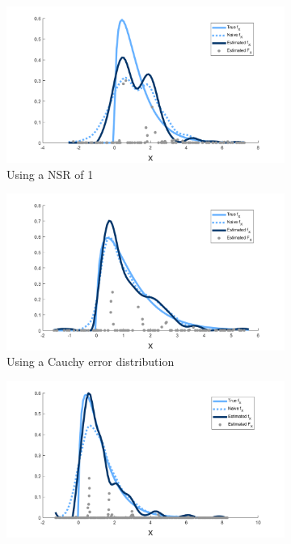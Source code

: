 \begin{figure}
	\begin{subfigure}[b]{0.49\textwidth}
		\centering
		\includegraphics[width = \textwidth]{Figures/Deconvolution/fixed_masses_example_NSR1.png}
		\caption{Using a NSR of 1}
		\label{fig:fixed masses example NSR1}
	\end{subfigure}
	\hfill
	\begin{subfigure}[b]{0.49\textwidth}
		\centering
		\includegraphics[width = \textwidth]{Figures/Deconvolution/fixed_masses_example_Ucauchy.png}
		\caption{Using a Cauchy error distribution}
		\label{fig:fixed masses example Ucauchy}
	\end{subfigure}
	\begin{subfigure}[b]{0.49\textwidth}
		\centering
		\includegraphics[width = \textwidth]{Figures/Deconvolution/fixed_masses_example_n10000.png}

\end{subfigure}
\end{figure}
